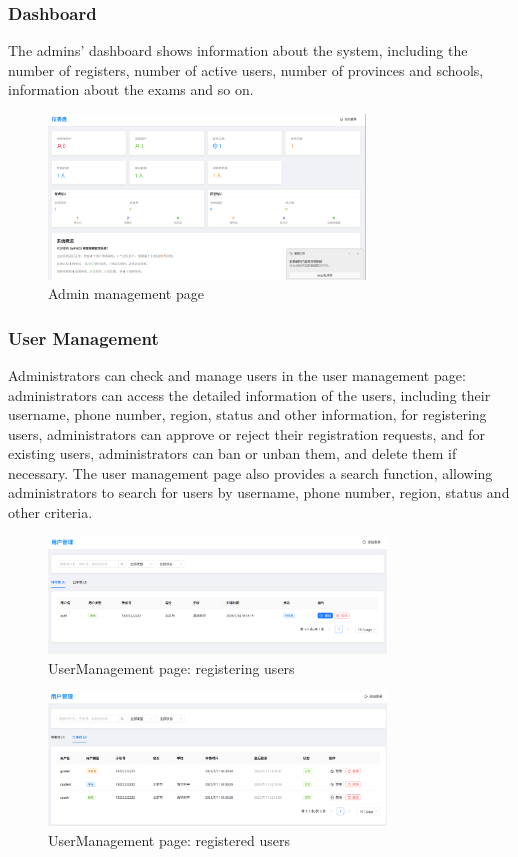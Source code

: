 \documentclass[12pt]{article}
\begin{document}
\subsubsection{Dashboard}
The admins' dashboard shows information about the system, including the number of registers, number of active users, number of provinces and schools,
information about the exams and so on.
\begin{figure}[H]
    \centering
    \includegraphics[width=0.75\textwidth]{admin/dashboard4admin.png}
    \caption{Admin management page}
    \label{fig:adminmanage page}
\end{figure}
\subsubsection{User Management}
Administrators can check and manage users in the user management page: administrators can access the detailed information of
the users, including their username, phone number, region, status and other information,
for registering users, administrators can approve or reject their registration requests, and for existing users, administrators can ban or unban them,
and delete them if necessary.
The user management page also provides a search function, allowing administrators to search for users by username, phone number, region,
status and other criteria.
\begin{figure}[H]
    \centering
    \includegraphics[width=0.8\textwidth]{admin/usermanage-1.png}
    \caption{UserManagement page: registering users}
    \label{fig:UserManagement page}
\end{figure}
\begin{figure}[H]
    \centering
    \includegraphics[width=0.8\textwidth]{admin/usermanage-2.png}
    \caption{UserManagement page: registered users}
    \label{fig:UserManagement page}
\end{figure}
\end{document}
